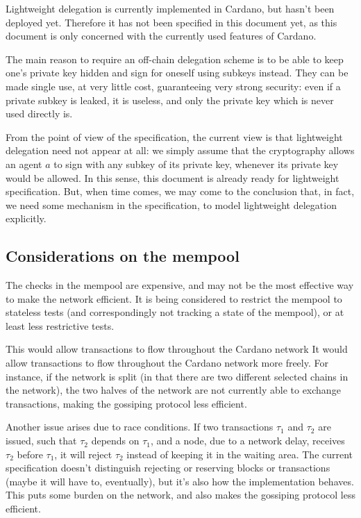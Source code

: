 \documentclass{article}
\begin{document}
Lightweight delegation is currently implemented in Cardano, but hasn't
been deployed yet. Therefore it has not been specified in this
document yet, as this document is only concerned with the currently
used features of Cardano.

The main reason to require an off-chain delegation scheme is to be
able to keep one's private key hidden and sign for oneself using
subkeys instead. They can be made single use, at very little cost,
guaranteeing very strong security: even if a private subkey is leaked,
it is useless, and only the private key which is never used directly
is.

From the point of view of the specification, the current view is that
lightweight delegation need not appear at all: we simply assume that
the cryptography allows an agent $a$ to sign with any subkey of its
private key, whenever its private key would be allowed. In this sense,
this document is already ready for lightweight specification. But,
when time comes, we may come to the conclusion that, in fact, we need
some mechanism in the specification, to model lightweight delegation
explicitly.

\subsection{Considerations on the mempool}
\label{sec:appendix-mempool}

The checks in the mempool are expensive, and may not be the most
effective way to make the network efficient. It is being considered to
restrict the mempool to stateless tests (and correspondingly not
tracking a state of the mempool), or at least less restrictive tests.

This would allow transactions to flow throughout the Cardano network
It would allow transactions to flow throughout the Cardano network
more freely. For instance, if the network is split (in that there are
two different selected chains in the network), the two halves of the
network are not currently able to exchange transactions, making the
gossiping protocol less efficient.

Another issue arises due to race conditions. If two transactions $τ_1$ and $τ_2$
are issued, such that $τ_2$ depends on $τ_1$, and a node, due to a network
delay, receives $τ_2$ before $τ_1$, it will reject $τ_2$ instead of keeping it
in the waiting area. The current specification doesn't distinguish rejecting or
reserving blocks or transactions (maybe it will have to, eventually), but it's
also how the implementation behaves. This puts some burden on the network, and
also makes the gossiping protocol less efficient.
\end{document}

